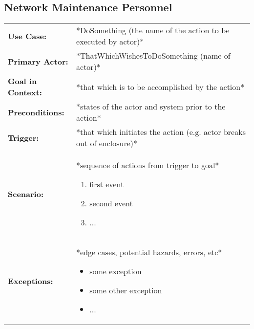\documentclass[12pt]{article}
\begin{document}
    \subsection{Network Maintenance Personnel}
    \begin{table}[H]
    \begin{tabular}{lp{9.9cm}}
        \hline
        \textbf{Use Case:}                     & *DoSomething (the name of the action to be executed by actor)* \\

        \textbf{Primary Actor:}                & *ThatWhichWishesToDoSomething (name of actor)*\\

        \textbf{Goal in Context:}              & *that which is to be accomplished by the action* \\

        \textbf{Preconditions:}                & *states of the actor and system prior to the action* \\

        \textbf{Trigger:}                      & *that which initiates the action (e.g. actor breaks out of enclosure)*\\

        \textbf{Scenario:}                     & *sequence of actions from trigger to goal*
                                                 \begin{enumerate}
                                                     \item first event
                                                     \item second event
                                                     \item ...
                                                 \end{enumerate} \\

        \textbf{Exceptions:}                   & *edge cases, potential hazards, errors, etc*
                                                 \begin{itemize}
                                                     \item[] some exception
                                                     \item[] some other exception
                                                     \item[] ...
                                                 \end{itemize}\\


\end{tabular}
\end{table}
\end{document}
